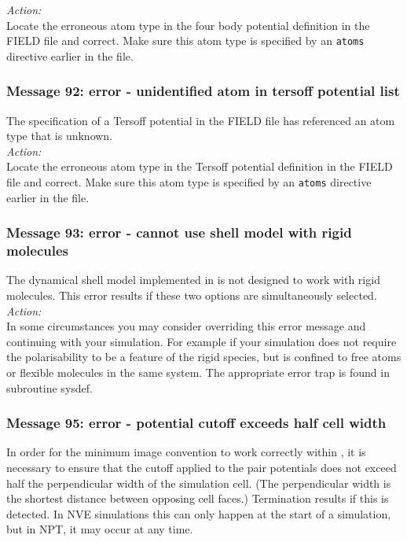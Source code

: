 \noindent
{\em Action:}\\
Locate the erroneous atom type in the four body potential definition in
the FIELD file and correct. Make sure this atom type is specified by
an {\tt atoms} directive earlier in the file.

\subsubsection*{Message 92: error - unidentified atom in tersoff potential list}

The specification of a Tersoff  potential in the FIELD file has
referenced an atom type that is unknown.\\

\noindent
{\em Action:}\\
Locate the erroneous atom type in the Tersoff potential definition in
the FIELD file and correct. Make sure this atom type is specified by
an {\tt atoms} directive earlier in the file.

\subsubsection*{Message 93: error - cannot use shell model with rigid
molecules}

The dynamical shell model  implemented in \D{} is not designed
to work with rigid molecules. This error results if these two options
are simultaneously selected. \\

\noindent
{\em Action:} \\ 
In some circumstances you may consider overriding
this error message and continuing with your simulation.  For example
if your simulation does not require the polarisability to be a feature
of the rigid species, but is confined to free atoms or flexible
molecules in the same system. The appropriate error trap is found in
subroutine {\sc sysdef}.

\subsubsection*{Message 95: error - potential cutoff exceeds half cell width}

In order for the minimum image convention to work correctly within
\D{}, it is necessary to ensure that the cutoff applied to the
pair potentials does not exceed half the perpendicular width of the
simulation cell. (The perpendicular width is the shortest distance
between opposing cell faces.) Termination results if this is detected.
In NVE simulations this can only happen at the start of a simulation,
but in NPT, it may occur at any time. \\ 

